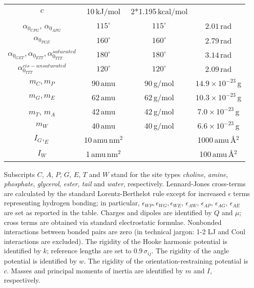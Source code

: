 \documentclass[10pt]{article}
\begin{document}
\begin{table*}[!ht]
\begin{tabular}{|c|c|c|c|}
 $c$& 10\,kJ/mol& 2*1.195\,kcal/mol&\\
 $\alpha_{0_{CPG}}$, $\alpha_{0_{APG}}$ & $115^{\circ}$& $115^{\circ}$& $2.01$\,rad\\
 $\alpha_{0_{PGE}}$ & $160^{\circ}$&$160^{\circ}$&$2.79$\,rad\\
 $\alpha_{0_{GET}},\alpha_{0_{ETT}},\alpha_{0_{TTT}}^{saturated}$ & $180^{\circ}$& $180^{\circ}$&$3.14$\,rad\\
 $\alpha_{0_{TTT}}^{cis-unsaturated}$ & $120^{\circ}$ & $120^{\circ}$ &$2.09$\,rad\\
 $m_C, m_P$ &  90\,amu&90\,g/mol& $14.9\times10^{-23}$\,g\\ 
 $m_G, m_E$ &  62\,amu& 62\,g/mol& $10.3\times10^{-23}$\,g\\
 $m_T$, $m_A$ &  42\,amu &  42\,g/mol & $7.0\times10^{-23}$\,g\\
 $m_W$ &  40\,amu &40\,g/mol & $6.6\times10^{-23}$\,g\\
 $I_G, _E$ &  10\,amu\,nm$^{2}$& & 1000\,amu\,\AA$^2$\\ 
 $I_W$ &  1\,amu\,nm$^{2}$& & 100\,amu\,\AA$^2$\\
\end{tabular}
\begin{flushleft}Subscripts $C$, $A$, $P$, $G$, $E$, $T$ and $W$ stand for the site types {\it choline}, {\it amine}, {\it phosphate}, {\it glycerol}, {\it ester}, {\it tail} and {\it water}, respectively. Lennard-Jones cross-terms are calculated by the standard Lorentz-Berthelot rule %
except for increased $\epsilon$ terms representing hydrogen bonding; in particular, $\epsilon_{WP},\epsilon_{WG}, \epsilon_{WE}$, $\epsilon_{AW}$, $\epsilon_{AP}$, $\epsilon_{AG}$, $\epsilon_{AE}$ are set as reported in the table. Charges and dipoles are identified by $Q$ and $\mu$; cross terms are obtained via standard electrostatic formulae. %
Nonbonded interactions between bonded pairs are zero (in technical jargon: 1-2 LJ and Coul interactions are excluded).
The rigidity of the Hooke harmonic potential %
is identified by $k$;  reference lengths are set to $0.9\,\sigma_{ij}$. The rigidity of the angle potential %
is identified by $w$. The rigidity of the orientation-restraining potential %
is $c$. Masses and principal moments of inertia are identified by $m$ and $I$, respectively. 
\end{flushleft}
\label{tab:lipidPars}
 \end{table*}





\end{document}
